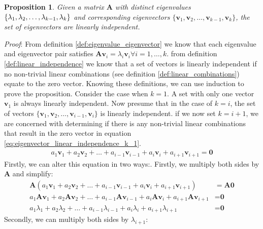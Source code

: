 \documentclass[a4paper,12pt]{book}
\newcommand{\matrx}[1]{\bm{#1}}
\newcommand{\vectr}[1]{\textbf{#1}}
\newcommand{\italic}[1]{\textit{#1}}
\newtheorem{proposition}{Proposition}[section]
\begin{document}
	\begin{proposition}
		\normalfont Given a matrix $ \matrx{A} $ with distinct eigenvalues $ \{\lambda_1,\lambda_2,\ldots \\,\lambda_{k - 1},\lambda_k\} $ and corresponding eigenvectors $ \{\vectr{v}_1,\vectr{v}_2,\ldots,\vectr{v}_{k - 1},\vectr{v}_k\} $, the set of eigenvectors are linearly independent.
		\label{prop:eigenvectors_linearly_independent}
	\end{proposition}
	\italic{Proof}: From definition \ref{def:eigenvalue_eigenvector} we know that each eigenvalue and eigenvector pair satisfies $ \matrx{A}\vectr{v}_i = \lambda_i \vectr{v}_i \forall i = 1,\ldots,k$. from definition \ref{def:linear_independence} we know that a set of vectors is linearly independent if no non-trivial linear combinations (see definition \ref{def:linear_combinations}) equate to the zero vector. Knowing these definitions, we can use induction to prove the proposition.
	Consider the case when $ k = 1 $. A set with only one vector $ \vectr{v}_1 $ is always linearly independent. Now presume that in the case of $ k = i $, the set of vectors $ \{\vectr{v}_1,\vectr{v}_2,\ldots,\vectr{v}_{i - 1},\vectr{v}_i\} $ is linearly independent. if we now set $ k = i + 1 $, we are concerned with determining if there is any non-trivial linear combinations that result in the zero vector in equation \ref{eq:eigenvector_linear_independence_k_1}. 
	\begin{align}
		a_1 \vectr{v}_1 + a_2 \vectr{v}_2 + \ldots + a_{i - 1} \vectr{v}_{i - 1} + a_i \vectr{v}_i + a_{i + 1} \vectr{v}_{i + 1} = \vectr{0}
		\label{eq:eigenvector_linear_independence_k_1}
	\end{align}
	Firstly, we can alter this equation in two ways:. Firstly, we multiply both sides by $ \matrx{A} $ and simplify:
	\begin{align}
		\matrx{A}(a_1 \vectr{v}_1 + a_2 \vectr{v}_2 + \ldots + a_{i - 1} \vectr{v}_{i - 1} + a_i \vectr{v}_i + a_{i + 1} \vectr{v}_{i + 1}) &= \matrx{A}\vectr{0} \nonumber \\
		a_1 \matrx{A}\vectr{v}_1 + a_2 \matrx{A}\vectr{v}_2 + \ldots + a_{i - 1} \matrx{A}\vectr{v}_{i - 1} + a_i \matrx{A}\vectr{v}_i + a_{i + 1} \matrx{A}\vectr{v}_{i + 1} &= \vectr{0} \nonumber \\
		\label{eq:eigenvector_linear_independence_eq_1} a_1 \lambda_1 + a_2 \lambda_2 + \ldots + a_{i - 1} \lambda_{i - 1} + a_i \lambda_i + a_{i + 1} \lambda_{i + 1} &= \vectr{0} 
	\end{align}
	Secondly, we can multiply both sides by $ \lambda_{i + 1} $:
\end{document}
